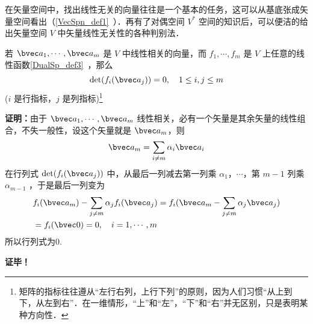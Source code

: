 
在矢量空间中，找出线性无关的向量往往是一个基本的任务，这可以从基底张成矢量空间看出（\autoref{VecSpn_def1}~）．再有了对偶空间 $V^*$ 空间的知识后，可以便洁的给出矢量空间 $V$ 中矢量线性无关性的各种判别法．
\begin{lemma}{}
若 $\bvec a_1,\cdots,\bvec a_m$ 是 $V$ 中线性相关的向量，而 $f_1,\cdots,f_m$ 是 $V$ 上任意的线性函数\autoref{DualSp_def3}~，那么
\begin{equation}
\det(f_i(\bvec a_j))=0,\quad 1\leq i,j\leq m
\end{equation}
($i$ 是行指标，$j$ 是列指标)\footnote{矩阵的指标往往遵从“左行右列，上行下列”的原则，因为人们习惯“从上到下，从左到右”．在一维情形，“上”和“左”，“下”和“右”并无区别，只是表明某种方向性．}
\end{lemma}
\textbf{证明：}由于 $\bvec a_1,\cdots,\bvec a_m$ 线性相关，必有一个矢量是其余矢量的线性组合，不失一般性，设这个矢量就是 $\bvec a_m$，则
\begin{equation}
\bvec a_m=\sum_{i\neq m}\alpha_i\bvec a_i
\end{equation}
在行列式 $\det(f_i(\bvec a_j))$ 中，从最后一列减去第一列乘 $\alpha_1$，$\cdots$，第 $m-1$ 列乘 $\alpha_{m-1}$ ，于是最后一列变为
\begin{equation}
\begin{aligned}
&f_i(\bvec a_m)-\sum_{j\neq m}\alpha_j f_i(\bvec a_j)=f_i(\bvec a_m-\sum_{j\neq m}\alpha_{j}\bvec a_j)\\
&=f_i(\bvec 0)=0,\quad i=1,\cdots ,m
\end{aligned}
\end{equation}
所以行列式为0.

\textbf{证毕！}